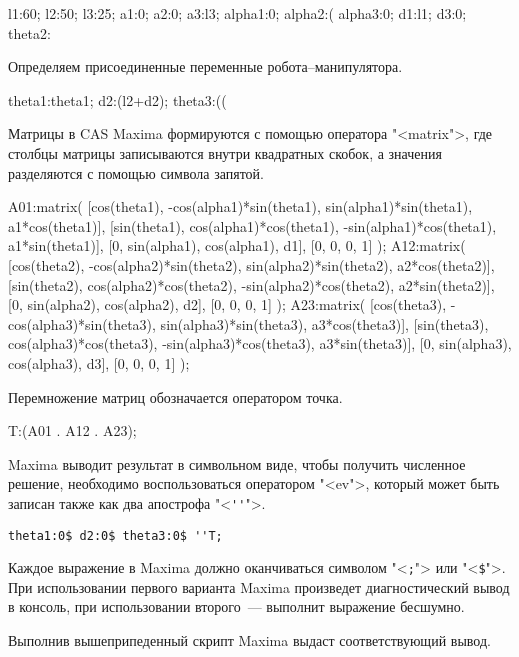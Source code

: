 \documentclass[oneside, final, 14pt]{extarticle}
\begin{document}
{{\small
\begin{listing}{24}
l1:60;
l2:50;
l3:25;
a1:0;
a2:0;
a3:l3;
alpha1:0;
alpha2:(%
alpha3:0;
d1:l1;
d3:0;
theta2:%
\end{listing}
}
\par
Определяем присоединенные переменные робота--манипулятора.

{\small
\begin{listing}{37}
theta1:theta1;
d2:(l2+d2);
theta3:((%
\end{listing}
}
\par
Матрицы в CAS Maxima формируются с помощью оператора "<{\ttfamily matrix}">, где столбцы матрицы записываются внутри квадратных скобок, а значения разделяются с помощью символа запятой.

{\small
\begin{listing}{41}
A01:matrix(
[cos(theta1), -cos(alpha1)*sin(theta1),
sin(alpha1)*sin(theta1), a1*cos(theta1)],
[sin(theta1), cos(alpha1)*cos(theta1),
-sin(alpha1)*cos(theta1), a1*sin(theta1)],
[0, sin(alpha1), cos(alpha1), d1],
[0, 0, 0, 1]
);
A12:matrix(
[cos(theta2), -cos(alpha2)*sin(theta2),
sin(alpha2)*sin(theta2), a2*cos(theta2)],
[sin(theta2), cos(alpha2)*cos(theta2),
-sin(alpha2)*cos(theta2), a2*sin(theta2)],
[0, sin(alpha2), cos(alpha2), d2],
[0, 0, 0, 1]
);
A23:matrix(
[cos(theta3), -cos(alpha3)*sin(theta3),
sin(alpha3)*sin(theta3), a3*cos(theta3)],
[sin(theta3), cos(alpha3)*cos(theta3),
-sin(alpha3)*cos(theta3), a3*sin(theta3)],
[0, sin(alpha3), cos(alpha3), d3],
[0, 0, 0, 1]
);
\end{listing}
}
\par
Перемножение матриц обозначается оператором точка.

{\small
\begin{listing}{66}
T:(A01 . A12 . A23);
\end{listing}
}
\par
Maxima выводит результат в символьном виде, чтобы получить численное решение, необходимо воспользоваться оператором "<{\ttfamily ev}">, который может быть записан также как два апострофа "<{\ttfamily \verb|''|}">.

{\small
\begin{verbatim}
theta1:0$ d2:0$ theta3:0$ ''T;
\end{verbatim}
}
\par
Каждое выражение в Maxima должно оканчиваться символом "<{\ttfamily \verb|;|}"> или "<{\ttfamily \verb|$|}">.
При использовании первого варианта Maxima произведет диагностический вывод в консоль, при использовании второго~--- выполнит выражение бесшумно.
\par
Выполнив вышеприпеденный скрипт Maxima выдаст соответствующий вывод.
\par

}
\end{document}

